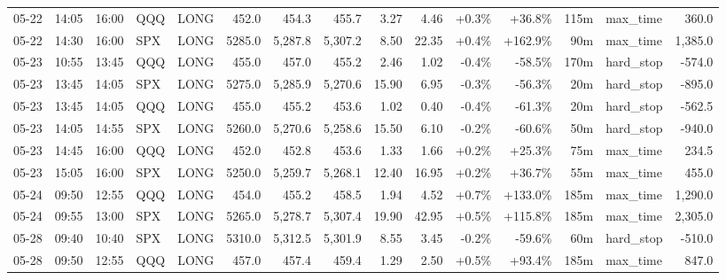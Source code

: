 \documentclass[11pt,a4paper,twoside]{article}
\begin{document}
\begin{landscape}
\begin{center}
\begin{longtable}{>{\color{txtmain}}l l l l l r r r r r r r r >{\color{txtmain}}l r}
05-22 & 14:05 & 16:00 & QQQ & LONG & 452.0 & 454.3 & 455.7 & 3.27 & 4.46 & \textcolor{wingreen}{+0.3\%} & \textcolor{wingreen}{+36.8\%} & 115m & max\_time & \textcolor{wingreen}{360.0} \\
05-22 & 14:30 & 16:00 & SPX & LONG & 5285.0 & 5,287.8 & 5,307.2 & 8.50 & 22.35 & \textcolor{wingreen}{+0.4\%} & \textcolor{wingreen}{+162.9\%} & 90m & max\_time & \textcolor{wingreen}{1,385.0} \\
05-23 & 10:55 & 13:45 & QQQ & LONG & 455.0 & 457.0 & 455.2 & 2.46 & 1.02 & \textcolor{lossred}{-0.4\%} & \textcolor{lossred}{-58.5\%} & 170m & hard\_stop & \textcolor{lossred}{-574.0} \\
05-23 & 13:45 & 14:05 & SPX & LONG & 5275.0 & 5,285.9 & 5,270.6 & 15.90 & 6.95 & \textcolor{lossred}{-0.3\%} & \textcolor{lossred}{-56.3\%} & 20m & hard\_stop & \textcolor{lossred}{-895.0} \\
05-23 & 13:45 & 14:05 & QQQ & LONG & 455.0 & 455.2 & 453.6 & 1.02 & 0.40 & \textcolor{lossred}{-0.4\%} & \textcolor{lossred}{-61.3\%} & 20m & hard\_stop & \textcolor{lossred}{-562.5} \\
05-23 & 14:05 & 14:55 & SPX & LONG & 5260.0 & 5,270.6 & 5,258.6 & 15.50 & 6.10 & \textcolor{lossred}{-0.2\%} & \textcolor{lossred}{-60.6\%} & 50m & hard\_stop & \textcolor{lossred}{-940.0} \\
05-23 & 14:45 & 16:00 & QQQ & LONG & 452.0 & 452.8 & 453.6 & 1.33 & 1.66 & \textcolor{wingreen}{+0.2\%} & \textcolor{wingreen}{+25.3\%} & 75m & max\_time & \textcolor{wingreen}{234.5} \\
05-23 & 15:05 & 16:00 & SPX & LONG & 5250.0 & 5,259.7 & 5,268.1 & 12.40 & 16.95 & \textcolor{wingreen}{+0.2\%} & \textcolor{wingreen}{+36.7\%} & 55m & max\_time & \textcolor{wingreen}{455.0} \\
05-24 & 09:50 & 12:55 & QQQ & LONG & 454.0 & 455.2 & 458.5 & 1.94 & 4.52 & \textcolor{wingreen}{+0.7\%} & \textcolor{wingreen}{+133.0\%} & 185m & max\_time & \textcolor{wingreen}{1,290.0} \\
05-24 & 09:55 & 13:00 & SPX & LONG & 5265.0 & 5,278.7 & 5,307.4 & 19.90 & 42.95 & \textcolor{wingreen}{+0.5\%} & \textcolor{wingreen}{+115.8\%} & 185m & max\_time & \textcolor{wingreen}{2,305.0} \\
05-28 & 09:40 & 10:40 & SPX & LONG & 5310.0 & 5,312.5 & 5,301.9 & 8.55 & 3.45 & \textcolor{lossred}{-0.2\%} & \textcolor{lossred}{-59.6\%} & 60m & hard\_stop & \textcolor{lossred}{-510.0} \\
05-28 & 09:50 & 12:55 & QQQ & LONG & 457.0 & 457.4 & 459.4 & 1.29 & 2.50 & \textcolor{wingreen}{+0.5\%} & \textcolor{wingreen}{+93.4\%} & 185m & max\_time & \textcolor{wingreen}{847.0} \\

\end{longtable}
\end{center}
\end{landscape}
\end{document}
